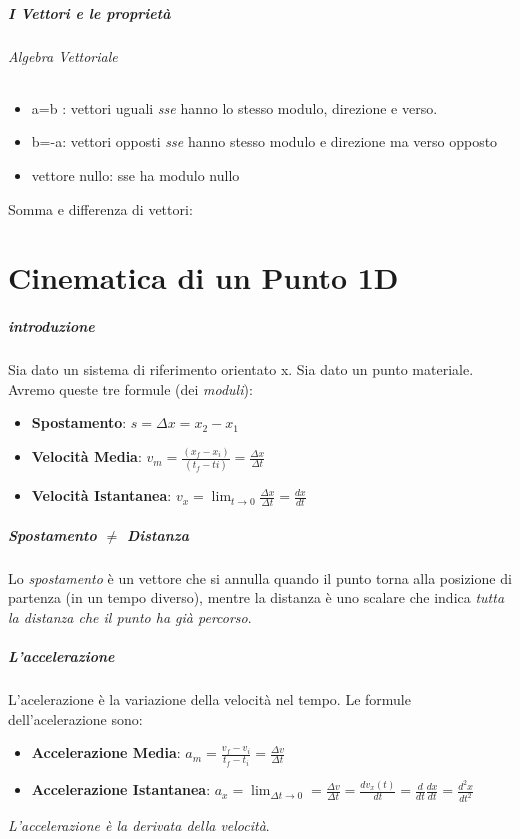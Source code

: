 \documentclass[12pt, a4paper, openany]{book}
\begin{document}
\paragraph{I Vettori e le proprietà}

\subparagraph*{Algebra Vettoriale}

\begin{itemize}
    \item a=b : vettori uguali \emph{sse} hanno lo stesso modulo, direzione e verso.
    \item b=-a: vettori opposti \emph{sse} hanno stesso modulo e direzione ma verso opposto
    \item vettore nullo: sse ha modulo nullo
\end{itemize}
Somma e differenza di vettori:

\chapter{Cinematica di un Punto 1D}
\paragraph{introduzione}
Sia dato un sistema di riferimento orientato x.
Sia dato un punto materiale.
Avremo queste tre formule (dei \emph{moduli}):
\begin{itemize}
    \item \textbf{Spostamento}: $s=\Delta x = x_2-x_1$
    \item \textbf{Velocità Media}: $v_m = \frac{(x_f-x_i)}{(t_f-ti)} = \frac{\Delta x}{\Delta t}$
    \item \textbf{Velocità Istantanea}: $v_x = \lim_{t\to 0} \frac{\Delta x}{\Delta t} = \frac{dx}{dt}$
\end{itemize}
\paragraph{Spostamento $\neq$ Distanza}
Lo \emph{spostamento} è un vettore che si annulla quando il punto torna alla posizione di partenza (in un tempo diverso),
mentre la distanza è uno scalare che indica \emph{tutta la distanza che il punto ha già percorso}.
\paragraph{L'accelerazione} L'acelerazione è la variazione della velocità nel tempo.
Le formule dell'acelerazione sono:
\begin{itemize}
    \item \textbf{Accelerazione Media}: $a_m = \frac{v_f-v_i}{t_f-t_i} = \frac{\Delta v}{\Delta t}$
    \item \textbf{Accelerazione Istantanea}: $a_x = \lim_{\Delta t \to 0} = \frac{\Delta v}{\Delta t} = \frac{dv_x(t)}{dt}= \frac{d}{dt}\frac{dx}{dt} = \frac{d^2x}{dt^2}$
\end{itemize}
\emph{L'accelerazione è la derivata della velocità}.
\end{document}
